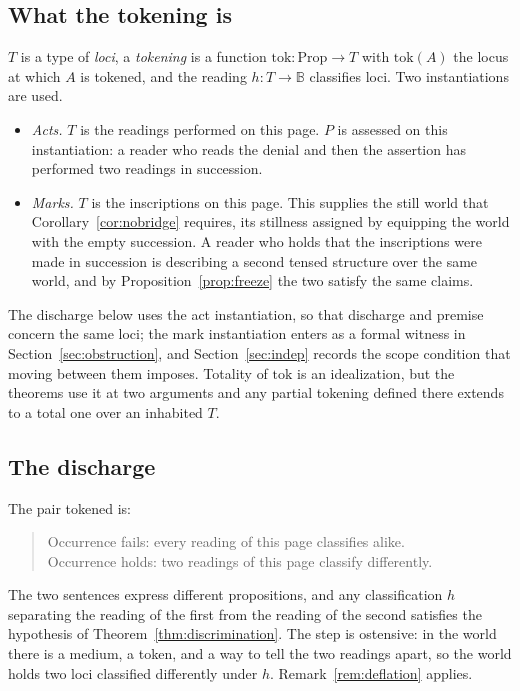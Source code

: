 \documentclass[11pt]{article}
\newcommand{\B}{\mathbb{B}}
\begin{document}
\subsection{What the tokening is}
\label{sec:tokenref}

$T$ is a type of \emph{loci}, a \emph{tokening} is a function $\mathrm{tok} : \mathrm{Prop} \to T$ with $\mathrm{tok}(A)$ the locus at which $A$ is tokened, and the reading $h : T \to \B$ classifies loci. Two instantiations are used.

\begin{itemize}[itemsep=1pt]
\item \emph{Acts.} $T$ is the readings performed on this page. $P$ is assessed on this instantiation: a reader who reads the denial and then the assertion has performed two readings in succession.
\item \emph{Marks.} $T$ is the inscriptions on this page. This supplies the still world that Corollary~\ref{cor:nobridge} requires, its stillness assigned by equipping the world with the empty succession. A reader who holds that the inscriptions were made in succession is describing a second tensed structure over the same world, and by Proposition~\ref{prop:freeze} the two satisfy the same claims.
\end{itemize}

The discharge below uses the act instantiation, so that discharge and premise concern the same loci; the mark instantiation enters as a formal witness in Section~\ref{sec:obstruction}, and Section~\ref{sec:indep} records the scope condition that moving between them imposes. Totality of $\mathrm{tok}$ is an idealization, but the theorems use it at two arguments and any partial tokening defined there extends to a total one over an inhabited $T$.

\subsection{The discharge}

The pair tokened is:
\begin{quote}
Occurrence fails: every reading of this page classifies alike.\\
Occurrence holds: two readings of this page classify differently.
\end{quote}
The two sentences express different propositions, and any classification $h$ separating the reading of the first from the reading of the second satisfies the hypothesis of Theorem~\ref{thm:discrimination}. The step is ostensive: in the world there is a medium, a token, and a way to tell the two readings apart, so the world holds two loci classified differently under $h$. Remark~\ref{rem:deflation} applies.
\end{document}
